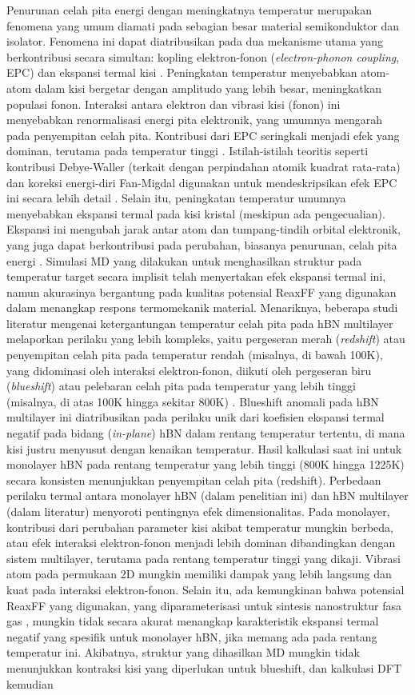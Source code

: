 Penurunan celah pita energi dengan meningkatnya temperatur merupakan fenomena yang umum diamati pada sebagian besar material semikonduktor dan isolator. Fenomena ini dapat diatribusikan pada dua mekanisme utama yang berkontribusi secara simultan: kopling elektron-fonon (\textit{electron-phonon coupling}, EPC) dan ekspansi termal kisi \citep{prethesis2}. Peningkatan temperatur menyebabkan atom-atom dalam kisi bergetar dengan amplitudo yang lebih besar, meningkatkan populasi fonon. Interaksi antara elektron dan vibrasi kisi (fonon) ini menyebabkan renormalisasi energi pita elektronik, yang umumnya mengarah pada penyempitan celah pita. Kontribusi dari EPC seringkali menjadi efek yang dominan, terutama pada temperatur tinggi . Istilah-istilah teoritis seperti kontribusi Debye-Waller (terkait dengan perpindahan atomik kuadrat rata-rata) dan koreksi energi-diri Fan-Migdal digunakan untuk mendeskripsikan efek EPC ini secara lebih detail . Selain itu, peningkatan temperatur umumnya menyebabkan ekspansi termal pada kisi kristal (meskipun ada pengecualian). Ekspansi ini mengubah jarak antar atom dan tumpang-tindih orbital elektronik, yang juga dapat berkontribusi pada perubahan, biasanya penurunan, celah pita energi . Simulasi MD yang dilakukan untuk menghasilkan struktur pada temperatur target secara implisit telah menyertakan efek ekspansi termal ini, namun akurasinya bergantung pada kualitas potensial ReaxFF yang digunakan dalam menangkap respons termomekanik material. Menariknya, beberapa studi literatur mengenai ketergantungan temperatur celah pita pada hBN multilayer melaporkan perilaku yang lebih kompleks, yaitu pergeseran merah (\textit{redshift}) atau penyempitan celah pita pada temperatur rendah (misalnya, di bawah 100K), yang didominasi oleh interaksi elektron-fonon, diikuti oleh pergeseran biru (\textit{blueshift}) atau pelebaran celah pita pada temperatur yang lebih tinggi (misalnya, di atas 100K hingga sekitar 800K) \citep{prethesis2}. Blueshift anomali pada hBN multilayer ini diatribusikan pada perilaku unik dari koefisien ekspansi termal negatif pada bidang (\textit{in-plane}) hBN dalam rentang temperatur tertentu, di mana kisi justru menyusut dengan kenaikan temperatur. Hasil kalkulasi saat ini untuk monolayer hBN pada rentang temperatur yang lebih tinggi (800K hingga 1225K) secara konsisten menunjukkan penyempitan celah pita (redshift). Perbedaan perilaku termal antara monolayer hBN (dalam penelitian ini) dan hBN multilayer (dalam literatur) menyoroti pentingnya efek dimensionalitas. Pada monolayer, kontribusi dari perubahan parameter kisi akibat temperatur mungkin berbeda, atau efek interaksi elektron-fonon menjadi lebih dominan dibandingkan dengan sistem multilayer, terutama pada rentang temperatur tinggi yang dikaji. Vibrasi atom pada permukaan 2D mungkin memiliki dampak yang lebih langsung dan kuat pada interaksi elektron-fonon. Selain itu, ada kemungkinan bahwa potensial ReaxFF yang digunakan, yang diparameterisasi untuk sintesis nanostruktur fasa gas \citep{Lele2022}, mungkin tidak secara akurat menangkap karakteristik ekspansi termal negatif yang spesifik untuk monolayer hBN, jika memang ada pada rentang temperatur ini. Akibatnya, struktur yang dihasilkan MD mungkin tidak menunjukkan kontraksi kisi yang diperlukan untuk blueshift, dan kalkulasi DFT kemudian 